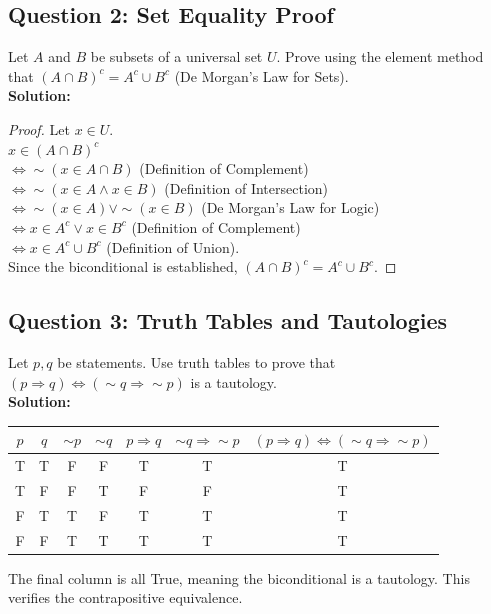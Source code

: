 \documentclass[11pt]{article}
\begin{document}
\subsection*{Question 2: Set Equality Proof}
Let $A$ and $B$ be subsets of a universal set $U$. Prove using the element method that $(A \cap B)^c = A^c \cup B^c$ (De Morgan's Law for Sets).\\
\textbf{Solution:}
\begin{proof}
Let $x \in U$. \\
$x \in (A \cap B)^c$ \\
$\Leftrightarrow \sim(x \in A \cap B)$ (Definition of Complement) \\
$\Leftrightarrow \sim(x \in A \wedge x \in B)$ (Definition of Intersection) \\
$\Leftrightarrow \sim(x \in A) \vee \sim(x \in B)$ (De Morgan's Law for Logic) \\
$\Leftrightarrow x \in A^c \vee x \in B^c$ (Definition of Complement) \\
$\Leftrightarrow x \in A^c \cup B^c$ (Definition of Union). \\
Since the biconditional is established, $(A \cap B)^c = A^c \cup B^c$.
\end{proof}

\subsection*{Question 3: Truth Tables and Tautologies}
Let $p, q$ be statements. Use truth tables to prove that $(p \Rightarrow q) \Leftrightarrow (\sim q \Rightarrow \sim p)$ is a tautology.\\
\textbf{Solution:}
\begin{center}
\begin{tabular}{|c|c|c|c|c|c|c|}
\hline
$p$ & $q$ & $\sim p$ & $\sim q$ & $p \Rightarrow q$ & $\sim q \Rightarrow \sim p$ & $(p \Rightarrow q) \Leftrightarrow (\sim q \Rightarrow \sim p)$ \\
\hline
T & T & F & F & T & T & T \\
T & F & F & T & F & F & T \\
F & T & T & F & T & T & T \\
F & F & T & T & T & T & T \\
\hline
\end{tabular}
\end{center}
The final column is all True, meaning the biconditional is a tautology. This verifies the contrapositive equivalence.
\end{document}
